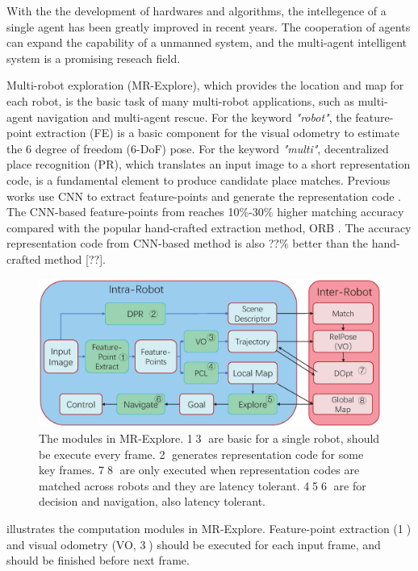 \label{sec:intro}

With the the development of hardwares and algorithms, the intellegence of a single agent has been greatly improved in recent years. 
The cooperation of agents can expand the capability of a unmanned system, and the multi-agent intelligent system is a promising reseach field.

Multi-robot exploration (MR-Explore), which provides the location and map for each robot, is the basic task of many multi-robot applications, such as multi-agent navigation and multi-agent rescue. 
For the keyword \textit{"robot"}, the feature-point extraction (FE) is a basic component for the visual odometry to estimate the 6 degree of freedom (6-DoF) pose.
For the keyword \textit{"multi"}, decentralized place recognition (PR), which translates an input image to a short representation code, is a fundamental element to produce candidate place matches.
Previous works use CNN to extract feature-points \cite{detone2018superpoint, simo2015discriminative, yi2016lift} and generate the representation code \cite{arandjelovic2016netvlad, radenovic2018fine}. The CNN-based feature-points from \cite{detone2018superpoint} reaches 10\%-30\% higher matching accuracy compared with the popular hand-crafted extraction method, ORB \cite{Mur-Artal:2017281}. The accuracy representation code from CNN-based method \cite{radenovic2018fine} is also ??\% better than the hand-crafted method [??].

\begin{figure}
	\centering
	\includegraphics[width=0.99\linewidth]{fig/maexp.eps}
    \caption{
        The modules in MR-Explore. \textcircled{1}\textcircled{3} are basic for a single robot, should be execute every frame. \textcircled{2} generates representation code for some key frames. \textcircled{7}\textcircled{8} are only executed when representation codes are matched across robots and they are latency tolerant.  \textcircled{4}\textcircled{5}\textcircled{6} are for decision and navigation, also latency tolerant.
    }
	\label{fig:maexp}
\end{figure}

 illustrates the computation modules in MR-Explore. Feature-point extraction (\textcircled{1}) and visual odometry (VO, \textcircled{3}) should be executed for each input frame, and should be finished before next frame.
